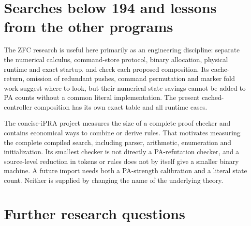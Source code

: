 \documentclass[11pt,letterpaper]{article}
\begin{document}
\section{Searches below 194 and lessons from the other programs}
\label{sec:search}



The ZFC research is useful here primarily as an engineering discipline:
separate the numerical calculus, command-store protocol, binary allocation,
physical runtime and exact startup, and check each proposed composition.
Its cache-return, omission of redundant pushes, command permutation and marker
fold work suggest where to look, but their numerical state savings cannot be
added to PA counts without a common literal implementation. The present
cached-controller composition has its own exact table and all runtime cases.

The concise-iPRA project measures the size of a complete proof checker and
contains economical ways to combine or derive rules. That motivates measuring
the complete compiled search, including parser, arithmetic, enumeration and
initialization. Its smallest checker is not directly a PA-refutation checker,
and a source-level reduction in tokens or rules does not by itself give a
smaller binary machine. A future import needs both a PA-strength calibration
and a literal state count. Neither is supplied by changing the name of the
underlying theory.

\section{Further research questions}
\end{document}

